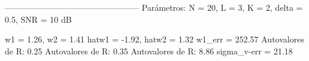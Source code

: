 
------------------------------------------------
Parámetros:
N = 20, L = 3, K = 2, delta = 0.5, SNR = 10 dB

w1 = 1.26, w2 = 1.41 
hat{w1} = -1.92, hat{w2} = 1.32
w1_{err} = 252.57 %
Autovalores de R: 0.25
Autovalores de R: 0.35
Autovalores de R: 8.86
sigma_v-err = 21.18 %
